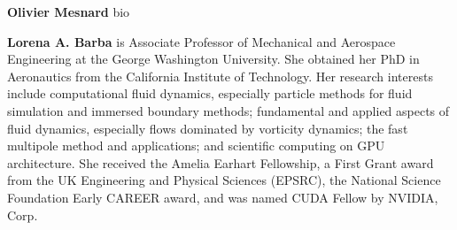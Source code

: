 \documentclass[10pt,twocolumn,twoside]{article}
\begin{document}
\small
{\sf 


\noindent \textbf{Olivier Mesnard} bio
\bigskip

\noindent\textbf{Lorena A. Barba} is Associate Professor of Mechanical and Aerospace Engineering at the George Washington University.
She obtained her PhD in Aeronautics from the California Institute of Technology.
Her research interests include computational fluid dynamics, especially particle methods for fluid simulation and immersed boundary methods; fundamental and applied aspects of fluid dynamics, especially flows dominated by vorticity dynamics; the fast multipole method and applications; and scientific computing on GPU architecture. 
She received the Amelia Earhart Fellowship, a First Grant award from the UK Engineering and Physical Sciences (EPSRC), the National Science Foundation Early CAREER award, and was named CUDA Fellow by NVIDIA, Corp.
}
\end{document}
